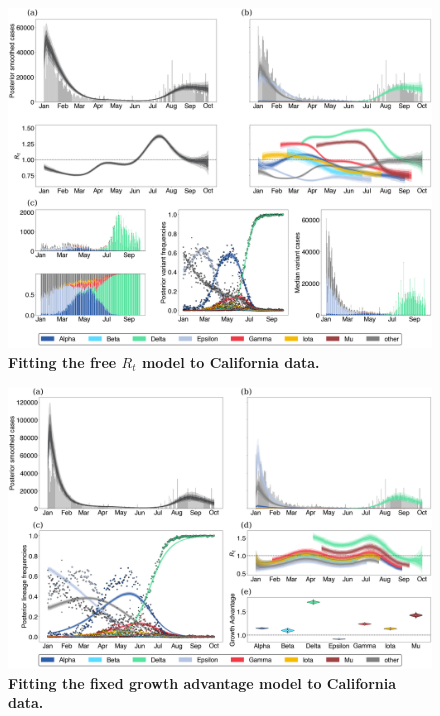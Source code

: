 \documentclass[11pt,oneside,letterpaper]{article}
\begin{document}
\begin{figure}
  \centering
  \includegraphics[width=\linewidth]{figs/free_rt_California.png}
  \caption{\textbf{Fitting the free $R_{t}$ model to California data.}}%
  \label{fig:free_rt_California}
\end{figure}

\begin{figure}
  \centering
  \includegraphics[width=\linewidth]{figs/fixed_growth_California.png}
  \caption{\textbf{Fitting the fixed growth advantage model to California data.}}%
  \label{fig:fixed_growth_California}
\end{figure}
\end{document}
